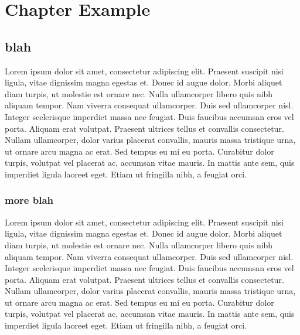 %
%
%
%

\chapter{Chapter Example} \label{ch:example}   		%

\section{blah}	\label{sec:example}			%
Lorem ipsum dolor sit amet, consectetur adipiscing elit. Praesent suscipit nisi ligula, vitae dignissim magna egestas et. Donec id augue dolor. Morbi aliquet diam turpis, ut molestie est ornare nec. Nulla ullamcorper libero quis nibh aliquam tempor. Nam viverra consequat ullamcorper. Duis sed ullamcorper nisl. Integer scelerisque imperdiet massa nec feugiat. Duis faucibus accumsan eros vel porta. Aliquam erat volutpat. Praesent ultrices tellus et convallis consectetur. Nullam ullamcorper, dolor varius placerat convallis, mauris massa tristique urna, ut ornare arcu magna ac erat. Sed tempus eu mi eu porta. Curabitur dolor turpis, volutpat vel placerat ac, accumsan vitae mauris. In mattis ante sem, quis imperdiet ligula laoreet eget. Etiam ut fringilla nibh, a feugiat orci.


\subsection{more blah}						%
Lorem ipsum dolor sit amet, consectetur adipiscing elit. Praesent suscipit nisi ligula, vitae dignissim magna egestas et. Donec id augue dolor. Morbi aliquet diam turpis, ut molestie est ornare nec. Nulla ullamcorper libero quis nibh aliquam tempor. Nam viverra consequat ullamcorper. Duis sed ullamcorper nisl. Integer scelerisque imperdiet massa nec feugiat. Duis faucibus accumsan eros vel porta. Aliquam erat volutpat. Praesent ultrices tellus et convallis consectetur. Nullam ullamcorper, dolor varius placerat convallis, mauris massa tristique urna, ut ornare arcu magna ac erat. Sed tempus eu mi eu porta. Curabitur dolor turpis, volutpat vel placerat ac, accumsan vitae mauris. In mattis ante sem, quis imperdiet ligula laoreet eget. Etiam ut fringilla nibh, a feugiat orci.


